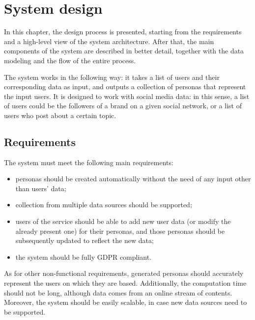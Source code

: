 \chapter{System design}
\label{cha:design}
In this chapter, the design process is presented, starting from the requirements and a high-level view of the system architecture. After that, the main components of the system are described in better detail, together with the data modeling and the flow of the entire process.

The system works in the following way: it takes a list of users and their corresponding data as input, and outputs a collection of personas that represent the input users. It is designed to work with social media data: in this sense, a list of users could be the followers of a brand on a given social network, or a list of users who post about a certain topic.


\section{Requirements}
\label{sec:requirements}
The system must meet the following main requirements:
\begin{itemize}
    \item personas should be created automatically without the need of any input other than users' data;
    \item collection from multiple data sources should be supported;
    \item users of the service should be able to add new user data (or modify the already present one) for their personas, and those personas should be subsequently updated to reflect the new data;
    \item the system should be fully GDPR compliant.
\end{itemize}
As for other non-functional requirements, generated personas should accurately represent the users on which they are based. Additionally, the computation time should not be long, although data comes from an online stream of contents. Moreover, the system should be easily scalable, in case new data sources need to be supported.

